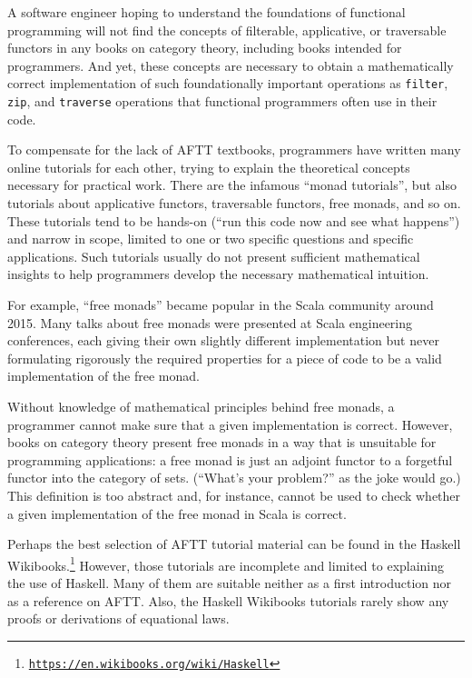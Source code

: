 A software engineer hoping to understand the foundations of functional
programming will not find the concepts of filterable, applicative,
or traversable functors in any books on category theory, including
books intended for programmers. And yet, these concepts are necessary
to obtain a mathematically correct implementation of such foundationally
important operations as \lstinline!filter!, \lstinline!zip!, and
\lstinline!traverse! \textendash{} operations that functional programmers
often use in their code.

To compensate for the lack of AFTT textbooks, programmers have written
many online tutorials for each other, trying to explain the theoretical
concepts necessary for practical work. There are the infamous ``monad
tutorials'', but also tutorials about applicative functors, traversable
functors, free monads, and so on. These tutorials tend to be hands-on
(``run this code now and see what happens'') and narrow in scope,
limited to one or two specific questions and specific applications.
Such tutorials usually do not present sufficient mathematical insights
to help programmers develop the necessary mathematical intuition.

For example, ``free monads'' became popular in the Scala community
around 2015. Many talks about free monads were presented at Scala
engineering conferences, each giving their own slightly different
implementation but never formulating rigorously the required properties
for a piece of code to be a valid implementation of the free monad.

Without knowledge of mathematical principles behind free monads, a
programmer cannot make sure that a given implementation is correct.
However, books on category theory present free monads in a way that
is unsuitable for programming applications: a free monad is just an
adjoint functor to a forgetful functor into the category of sets.
(``What's your problem?'' as the joke would go.) This definition
is too abstract and, for instance, cannot be used to check whether
a given implementation of the free monad in Scala is correct.

Perhaps the best selection of AFTT tutorial material can be found
in the Haskell Wikibooks.\footnote{\texttt{\href{https://en.wikibooks.org/wiki/Haskell}{https://en.wikibooks.org/wiki/Haskell}}}
However, those tutorials are incomplete and limited to explaining
the use of Haskell. Many of them are suitable neither as a first introduction
nor as a reference on AFTT. Also, the Haskell Wikibooks tutorials
rarely show any proofs or derivations of equational laws.

